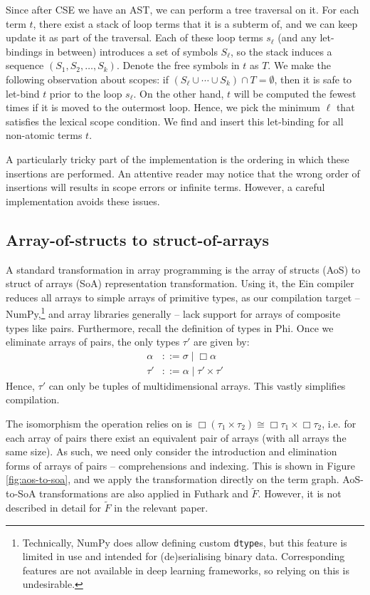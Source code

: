 Since after CSE we have an AST, we can perform a tree traversal on it. For each term $t$, there exist a stack of loop terms that it is a subterm of, and we can keep update it as part of the traversal. Each of these loop terms $s_\ell$ (and any let-bindings in between) introduces a set of symbols $S_\ell$, so the stack induces a sequence $(S_1, S_2, \dots, S_k)$. Denote the free symbols in $t$ as $T$. We make the following observation about scopes: if $\left( S_\ell \cup \cdots \cup S_k \right) \cap T = \emptyset$, then it is safe to let-bind $t$ prior to the loop $s_\ell$. On the other hand, $t$ will be computed the fewest times if it is moved to the outermost loop. Hence, we pick the minimum $\ell$ that satisfies the lexical scope condition. We find and insert this let-binding for all non-atomic terms $t$.

A particularly tricky part of the implementation is the ordering in which these insertions are performed. An attentive reader may notice that the wrong order of insertions will results in scope errors or infinite terms. However, a careful implementation avoids these issues.

\subsection{Array-of-structs to struct-of-arrays}

A standard transformation in array programming is the array of structs (AoS) to struct of arrays (SoA) representation transformation. Using it, the Ein compiler reduces all arrays to simple arrays of primitive types, as our compilation target -- NumPy,\footnote{Technically, NumPy does allow defining custom \texttt{dtype}s, but this feature is limited in use and intended for (de)serialising binary data. Corresponding features are not available in deep learning frameworks, so relying on this is undesirable.} and array libraries generally -- lack support for arrays of composite types like pairs. Furthermore, recall the definition of types in Phi. Once we eliminate arrays of pairs, the only types $\tau'$ are given by:
\begin{align*}
\alpha &::= \sigma \mid \Box \alpha \\
\tau' &::= \alpha \mid \tau' \times \tau'
\end{align*}
Hence, $\tau'$ can only be tuples of multidimensional arrays. This vastly simplifies compilation. 

The isomorphism the operation relies on is $\Box (\tau_1 \times \tau_2) \cong \Box \tau_1 \times \Box \tau_2$, i.e. for each array of pairs there exist an equivalent pair of arrays (with all arrays the same size). As such, we need only consider the introduction and elimination forms of arrays of pairs -- comprehensions and indexing. This is shown in Figure \ref{fig:aos-to-soa}, and we apply the transformation directly on the term graph. AoS-to-SoA transformations are also applied in Futhark and $\tilde F$. However, it is not described in detail for $\tilde F$ in the relevant paper.

